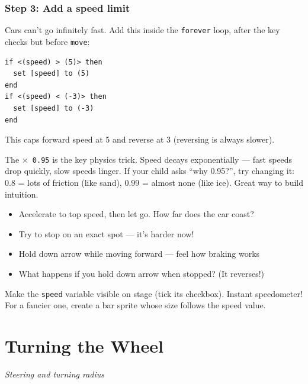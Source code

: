\documentclass[11pt,a4paper]{article}
\begin{document}
\subsubsection{Step 3: Add a speed limit}

Cars can't go infinitely fast. Add this inside the \texttt{forever} loop, after the key checks but before \texttt{move}:

\begin{scratchblockbox}
\begin{lstlisting}[style=scratch]
if <(speed) > (5)> then
  set [speed] to (5)
end
if <(speed) < (-3)> then
  set [speed] to (-3)
end
\end{lstlisting}
\end{scratchblockbox}

This caps forward speed at 5 and reverse at 3 (reversing is always slower).

\begin{parentbox}
The \texttt{$\times$ 0.95} is the key physics trick. Speed decays exponentially --- fast speeds drop quickly, slow speeds linger. If your child asks ``why 0.95?'', try changing it: 0.8 = lots of friction (like sand), 0.99 = almost none (like ice). Great way to build intuition.
\end{parentbox}

\begin{challengebox}
\begin{itemize}[nosep]
  \item Accelerate to top speed, then let go. How far does the car coast?
  \item Try to stop on an exact spot --- it's harder now!
  \item Hold down arrow while moving forward --- feel how braking works
  \item What happens if you hold down arrow when stopped? (It reverses!)
\end{itemize}
\end{challengebox}

\begin{stretchbox}
Make the \texttt{speed} variable visible on stage (tick its checkbox). Instant speedometer! For a fancier one, create a bar sprite whose size follows the speed value.
\end{stretchbox}

\newpage

\section{Turning the Wheel}
\textit{\large Steering and turning radius}
\end{document}
